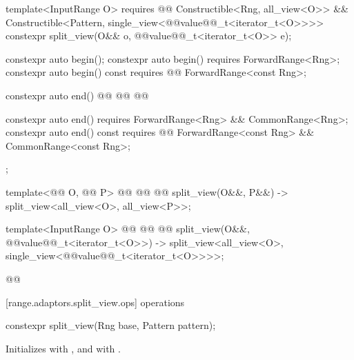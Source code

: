 {\begin{codeblock}
{{    template<InputRange O>
      requires @@
        Constructible<Rng, all_view<O>> &&
        Constructible<Pattern, single_view<@@value@@_t<iterator_t<O>>>>
    constexpr split_view(O&& o, @@value@@_t<iterator_t<O>> e);

    constexpr auto begin();
    constexpr auto begin() requires ForwardRange<Rng>;
    constexpr auto begin() const
      requires @@ ForwardRange<const Rng>;

    constexpr auto end() @@
    @@
      @@

    constexpr auto end()
      requires ForwardRange<Rng> && CommonRange<Rng>;
    constexpr auto end() const
      requires @@ ForwardRange<const Rng> && CommonRange<const Rng>;
  };

  template<@@ O, @@ P>
    @@
      @@
      @@
  split_view(O&&, P&&) -> split_view<all_view<O>, all_view<P>>;

  template<InputRange O>
    @@
      @@
      @@
  split_view(O&&, @@value@@_t<iterator_t<O>>)
    -> split_view<all_view<O>, single_view<@@value@@_t<iterator_t<O>>>>;
}@\oldtxt{\}}@
\end{codeblock}

[range.adaptors.split_view.ops]{ operations}

%
\begin{itemdecl}
constexpr split_view(Rng base, Pattern pattern);
\end{itemdecl}

\begin{itemdescr}
\pnum
\effects Initializes  with , and
  with .
\end{itemdescr}

}
